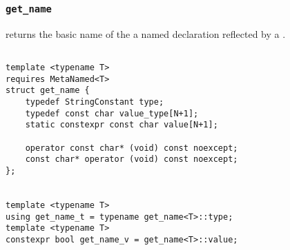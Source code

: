 
\subsubsection{\texttt{get\_name}}

returns the basic name of the a named declaration reflected by a .

\begin{verbatim}

template <typename T>
requires MetaNamed<T>
struct get_name {
	typedef StringConstant type;
	typedef const char value_type[N+1];
	static constexpr const char value[N+1];

	operator const char* (void) const noexcept;
	const char* operator (void) const noexcept;
};


template <typename T>
using get_name_t = typename get_name<T>::type;
template <typename T>
constexpr bool get_name_v = get_name<T>::value;

\end{verbatim}

